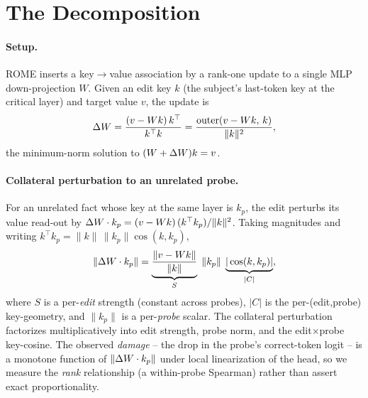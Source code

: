 \section{The \texorpdfstring{\SxC}{SxC} Decomposition}
\label{sec:method}

\paragraph{Setup.} ROME inserts a key$\rightarrow$value association by a rank-one
update to a single MLP down-projection $W$. Given an edit key $k$ (the
subject's last-token key at the critical layer) and target value $v$, the
update is
\begin{equation}
\Delta W = \frac{(v-Wk)\,k^{\top}}{k^{\top}k}
    = \frac{\mathrm{outer}(v-Wk,\,k)}{\|k\|^2},
\label{eq:rome}
\end{equation}
the minimum-norm solution to $(W+\Delta W)k=v$.

\paragraph{Collateral perturbation to an unrelated probe.} For an unrelated
fact whose key at the same layer is $k_p$, the edit perturbs its value
read-out by $\Delta W\cdot k_p = (v-Wk)\,(k^{\top}k_p)/\|k\|^2$. Taking magnitudes
and writing $k^{\top}k_p = \|k\|\,\|k_p\|\cos(k,k_p)$,
\begin{equation}
\|\Delta W\cdot k_p\| = \underbrace{\frac{\|v-Wk\|}{\|k\|}}_{S}\;\|k_p\|\;
                   \underbrace{|\cos(k,k_p)|}_{|C|},
\label{eq:sc}
\end{equation}
where $S$ is a per-\emph{edit} strength (constant across probes), $|C|$ is the
per-(edit,probe) key-geometry, and $\|k_p\|$ is a per-\emph{probe} scalar. The
collateral perturbation factorizes multiplicatively into edit strength, probe
norm, and the edit$\times$probe key-cosine. The observed \emph{damage} -- the
drop in the probe's correct-token logit -- is a monotone function of
$\|\Delta W\cdot k_p\|$ under local linearization of the head, so we measure the
\emph{rank} relationship (a within-probe Spearman) rather than assert exact
proportionality.

